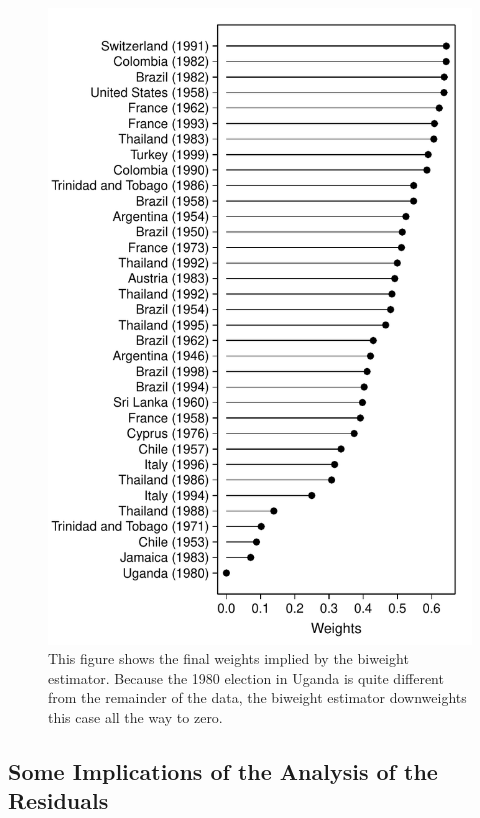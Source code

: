 \documentclass[12pt]{article}
\begin{document}
\begin{figure}[H]
\begin{center}
\includegraphics[scale = 0.8]{figs/cg-weights.pdf}
\caption{This figure shows the final weights implied by the biweight estimator. Because the 1980 election in Uganda is quite different from the remainder of the data, the biweight estimator downweights this case all the way to zero.}\label{fig:cg-weights}
\end{center}
\end{figure}

\subsection*{Some Implications of the Analysis of the Residuals}
\end{document}

